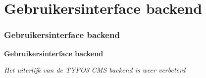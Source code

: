 %

\section{Gebruikersinterface backend}
\begin{frame}[fragile]
	\frametitle{Gebruikersinterface backend}

	\begin{center}\huge{\color{typo3darkgrey}\textbf{Gebruikersinterface backend}}\end{center}
	\begin{center}\large{\textit{Het uiterlijk van de TYPO3 CMS backend is weer verbeterd}}\end{center}

\end{frame}

